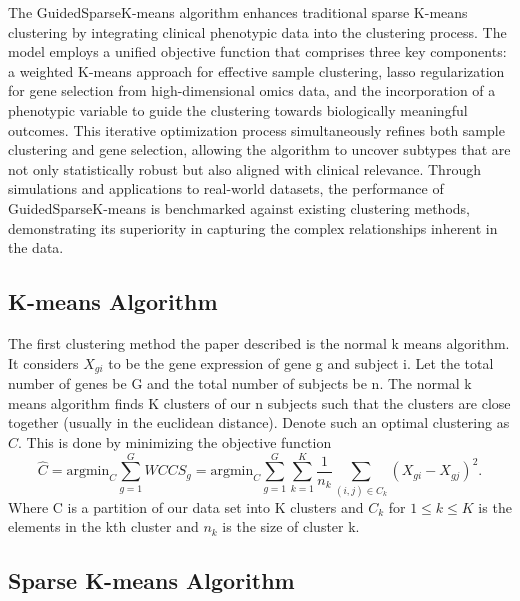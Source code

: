 \documentclass{statsoc}
\begin{document}
The GuidedSparseK-means algorithm enhances traditional sparse K-means clustering by integrating clinical phenotypic data into the clustering process. The model employs a unified objective function that comprises three key components: a weighted K-means approach for effective sample clustering, lasso regularization for gene selection from high-dimensional omics data, and the incorporation of a phenotypic variable to guide the clustering towards biologically meaningful outcomes. This iterative optimization process simultaneously refines both sample clustering and gene selection, allowing the algorithm to uncover subtypes that are not only statistically robust but also aligned with clinical relevance. Through simulations and applications to real-world datasets, the performance of GuidedSparseK-means is benchmarked against existing clustering methods, demonstrating its superiority in capturing the complex relationships inherent in the data.

\subsection{K-means Algorithm}

The first clustering method the paper described is the normal k means algorithm. It considers $X_{gi}$ to be the gene expression of gene g and subject i. Let the total number of genes be G and the total number of subjects be n. The normal k means algorithm finds K clusters of our n subjects such that the clusters are close together (usually in the euclidean distance). Denote such an optimal clustering as $\hat{C}$. This is done by minimizing the objective function 
\begin{equation}
    \hat{C} = \textrm{argmin}_C \sum_{g=1}^G WCCS_g = \textrm{argmin}_C \sum_{g=1}^G \sum_{k = 1}^K \frac{1}{n_k} \sum_{(i,j) \in C_k} (X_{gi} - X_{gj})^2. 
\end{equation}
Where C is a partition of our data set into K clusters and $C_k$ for $1\leq k \leq K$ is the elements in the kth cluster and $n_k$ is the size of cluster k.

\subsection{Sparse K-means Algorithm}
\end{document}

